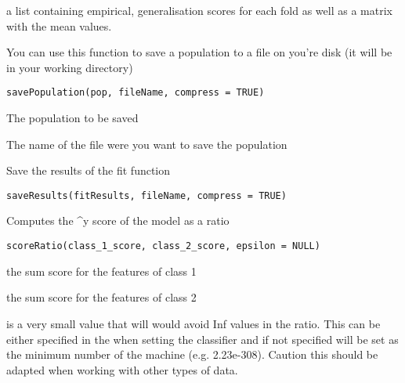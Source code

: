 \documentclass[a4paper]{book}
\begin{document}
%
\begin{Value}
a list containing empirical, generalisation scores for each fold as well as a matrix with the mean values.
\end{Value}
%
\begin{Description}
You can use this function to save a population to a file on you're disk (it will be in your working directory)
\end{Description}
%
\begin{Usage}
\begin{verbatim}
savePopulation(pop, fileName, compress = TRUE)
\end{verbatim}
\end{Usage}
%
\begin{Arguments}
\begin{ldescription}
\item[\code{pop:}] The population to be saved

\item[\code{fileName:}] The name of the file were you want to save the population
\end{ldescription}
\end{Arguments}
%
\begin{Description}
Save the results of the fit function
\end{Description}
%
\begin{Usage}
\begin{verbatim}
saveResults(fitResults, fileName, compress = TRUE)
\end{verbatim}
\end{Usage}
%
\begin{Description}
Computes the \textasciicircum{}y score of the model as a ratio
\end{Description}
%
\begin{Usage}
\begin{verbatim}
scoreRatio(class_1_score, class_2_score, epsilon = NULL)
\end{verbatim}
\end{Usage}
%
\begin{Arguments}
\begin{ldescription}
\item[\code{class\_1\_score:}] the sum score for the features of class 1

\item[\code{class\_2\_score:}] the sum score for the features of class 2

\item[\code{epsilon:}] is a very small value that will would avoid Inf values in the ratio. This can be either specified in the when setting the classifier and if not specified will be set as the minimum number of the machine (e.g. 2.23e-308). Caution this should be adapted when working with other types of data.
\end{ldescription}
\end{Arguments}
\end{document}
